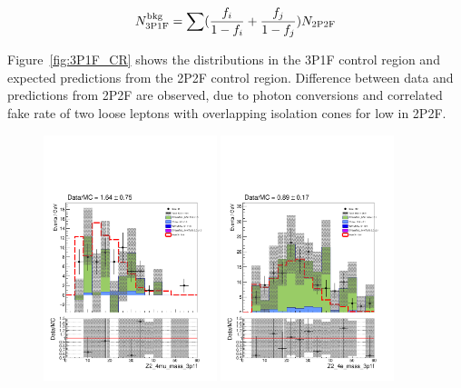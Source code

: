 \begin{equation} 
\label{eq:Prediction3P1F}
N^{\rm bkg}_{\rm 3P1F} = \sum (\frac{f_{i}}{1-f_{i}}
+ \frac{f_{j}}{1-f_{j}}) N_{\rm 2P2F}
\end{equation} 

Figure~\ref{fig:3P1F_CR} shows the  distributions in the 3P1F control region and expected predictions from 
the 2P2F control region. Difference between data and predictions from 2P2F are observed, due to photon conversions and 
correlated fake rate of two loose leptons with overlapping isolation cones for low  in 2P2F. 

\begin{figure}[!htb]
\begin{center}
    {\includegraphics [width=0.45\textwidth] {Figures/RedBkg/3P1F_vs_Pred/Z2_4mu_mass_3p1f.pdf}}
    {\includegraphics [width=0.45\textwidth] {Figures/RedBkg/3P1F_vs_Pred/Z2_4e_mass_3p1f.pdf}} \\

\end{center}
\end{figure}
